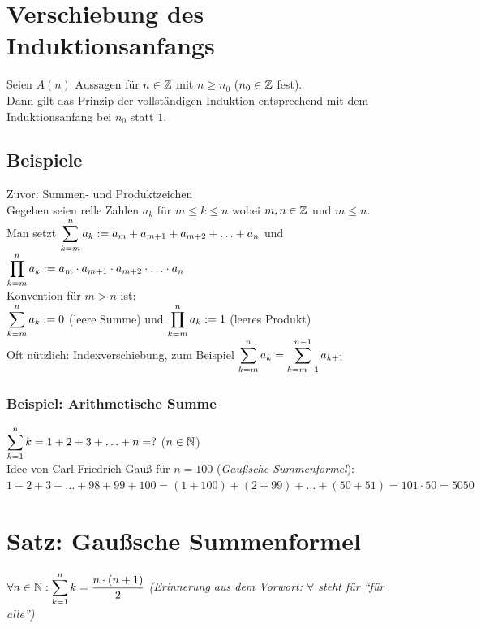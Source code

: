 \newpage

{}
\section*{Verschiebung des Induktionsanfangs}
Seien $A(n)$ Aussagen für $n \in \mathbb{Z}$ mit $n \ge n_0$ ($n_0 \in \mathbb{Z}$ fest).\\
Dann gilt das Prinzip der vollständigen Induktion entsprechend mit dem Induktionsanfang bei $n_0$ statt $1$.

\subsection*{Beispiele}
Zuvor: Summen- und Produktzeichen\\
Gegeben seien relle Zahlen $a_k$ für $m \le k \le n$ wobei $m,n \in \mathbb{Z}$ und $m \le n$.\\
Man setzt $\displaystyle\sum_{k=m}^n a_k := a_m + a_{m+1} + a_{m+2} + \hdots + a_n$ und $\displaystyle\prod_{k=m}^n a_k := a_m \cdot a_{m+1} \cdot a_{m+2} \cdot \hdots \cdot a_n$\\
Konvention für $m>n$ ist:\\
$\displaystyle\sum_{k=m}^n a_k := 0$ (leere Summe) und $\displaystyle\prod_{k=m}^n a_k := 1$ (leeres Produkt)\\
Oft nützlich: Indexverschiebung, zum Beispiel $\displaystyle\sum_{k=m}^n a_k = \displaystyle\sum_{k=m-1}^{n-1} a_{k+1}$

\subsubsection*{Beispiel: Arithmetische Summe}
$\displaystyle\sum_{k=1}^n k = 1 + 2 + 3 + \hdots + n = ?$ ($n \in \mathbb{N}$)\\
Idee von \href{https://de.wikipedia.org/wiki/Carl_Friedrich_Gau\%C3\%9F}{Carl Friedrich Gauß} für $n=100$ (\emph{Gaußsche Summenformel}):\\
$1+2+3+\hdots+98+99+100 = (1+100)+(2+99)+\hdots+(50+51) = 101 \cdot 50 = 5050$

\section{Satz: Gaußsche Summenformel}\label{2.3}
$\forall n \in \mathbb{N} : \displaystyle\sum_{k=1}^n k = \frac{n \cdot (n+1)}{2}$ \emph{(Erinnerung aus dem Vorwort: $\forall$ steht für ``für alle'')}

